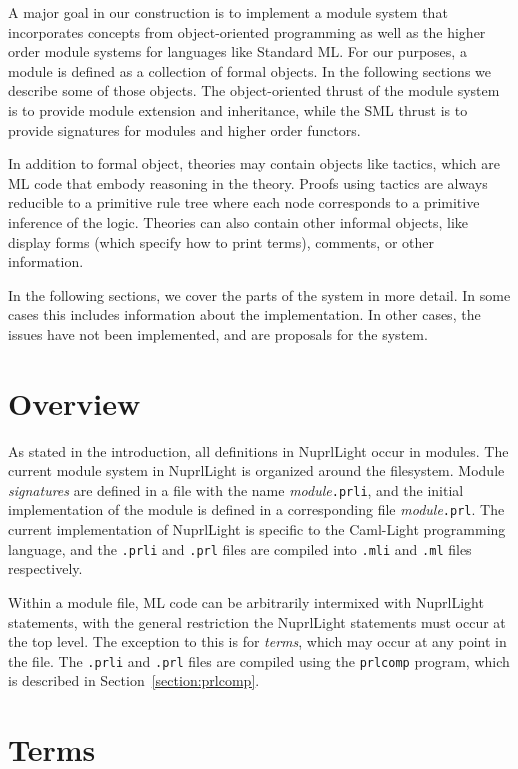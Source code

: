 \documentclass{article}
\newcommand\NuprlLight{NuprlLight}
\begin{document}
A major goal in our construction is to implement a module system that incorporates concepts from
object-oriented programming as well as the higher order module systems for languages like Standard
ML.  For our purposes, a module is defined as a collection of formal objects. In the following
sections we describe some of those objects. The object-oriented thrust of the module system is to
provide module extension and inheritance, while the SML thrust is to provide signatures for modules
and higher order functors.

In addition to formal object, theories may contain objects like tactics, which are ML code that embody reasoning 
in the theory.  Proofs using tactics are always reducible to a primitive rule tree where each node 
corresponds to a primitive inference of the logic.  Theories can also contain other informal objects, like
display forms (which specify how to print terms), comments, or other information.

In the following sections, we cover the parts of the system in more detail.  In some cases this
includes information about the implementation.  In other cases, the issues have not been
implemented, and are proposals for the system.

\section{Overview}

As stated in the introduction, all definitions in \NuprlLight{} occur in modules.  The current
module system in \NuprlLight{} is organized around the filesystem.  Module {\em signatures\/} are
defined in a file with the name {\it module}{\tt .prli}, and the initial implementation of the
module is defined in a corresponding file {\it module}{\tt .prl}.  The current implementation of
\NuprlLight{} is specific to the Caml-Light programming language, and the {\tt .prli} and {\tt .prl}
files are compiled into {\tt .mli} and {\tt .ml} files respectively.

Within a module file, ML code can be arbitrarily intermixed with \NuprlLight{} statements, with the
general restriction the \NuprlLight{} statements must occur at the top level.  The exception to this
is for {\em terms}, which may occur at any point in the file.  The {\tt .prli} and {\tt .prl} files are compiled
using the {\tt prlcomp} program, which is described in Section~\ref{section:prlcomp}.

\section{Terms}
\end{document}

